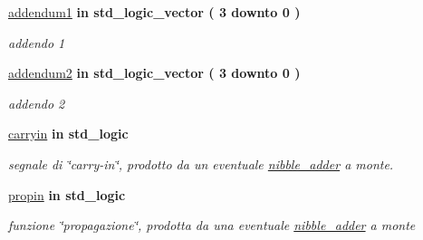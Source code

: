  \begin{DoxyCompactItemize}
\item 
\hyperlink{group___nibble_adder_ga2c8945f4747b9a5448412c95fc281c87}{addendum1}  {\bfseries {\bfseries \textcolor{vhdlchar}{in}\textcolor{vhdlchar}{ }}} {\bfseries \textcolor{vhdlchar}{std\+\_\+logic\+\_\+vector}\textcolor{vhdlchar}{ }\textcolor{vhdlchar}{(}\textcolor{vhdlchar}{ }\textcolor{vhdlchar}{ } \textcolor{vhdldigit}{3} \textcolor{vhdlchar}{ }\textcolor{vhdlchar}{downto}\textcolor{vhdlchar}{ }\textcolor{vhdlchar}{ } \textcolor{vhdldigit}{0} \textcolor{vhdlchar}{ }\textcolor{vhdlchar}{)}\textcolor{vhdlchar}{ }} 
\begin{DoxyCompactList}\small\item\em addendo 1 \end{DoxyCompactList}\item 
\hyperlink{group___nibble_adder_gad1fa6d9d78208885ad2f4c417fc4b530}{addendum2}  {\bfseries {\bfseries \textcolor{vhdlchar}{in}\textcolor{vhdlchar}{ }}} {\bfseries \textcolor{vhdlchar}{std\+\_\+logic\+\_\+vector}\textcolor{vhdlchar}{ }\textcolor{vhdlchar}{(}\textcolor{vhdlchar}{ }\textcolor{vhdlchar}{ } \textcolor{vhdldigit}{3} \textcolor{vhdlchar}{ }\textcolor{vhdlchar}{downto}\textcolor{vhdlchar}{ }\textcolor{vhdlchar}{ } \textcolor{vhdldigit}{0} \textcolor{vhdlchar}{ }\textcolor{vhdlchar}{)}\textcolor{vhdlchar}{ }} 
\begin{DoxyCompactList}\small\item\em addendo 2 \end{DoxyCompactList}\item 
\hyperlink{group___nibble_adder_gaa556a73dc4a4de1a0d662b25adbcbe33}{carryin}  {\bfseries {\bfseries \textcolor{vhdlchar}{in}\textcolor{vhdlchar}{ }}} {\bfseries \textcolor{vhdlchar}{std\+\_\+logic}\textcolor{vhdlchar}{ }} 
\begin{DoxyCompactList}\small\item\em segnale di \char`\"{}carry-\/in\char`\"{}, prodotto da un eventuale \hyperlink{classnibble__adder}{nibble\+\_\+adder} a monte. \end{DoxyCompactList}\item 
\hyperlink{group___nibble_adder_ga422e8e7ee01fc7ac7b7390cd2ad8c87b}{propin}  {\bfseries {\bfseries \textcolor{vhdlchar}{in}\textcolor{vhdlchar}{ }}} {\bfseries \textcolor{vhdlchar}{std\+\_\+logic}\textcolor{vhdlchar}{ }} 
\begin{DoxyCompactList}\small\item\em funzione \char`\"{}propagazione\char`\"{}, prodotta da una eventuale \hyperlink{classnibble__adder}{nibble\+\_\+adder} a monte \end{DoxyCompactList}\item 

\end{DoxyCompactItemize}
